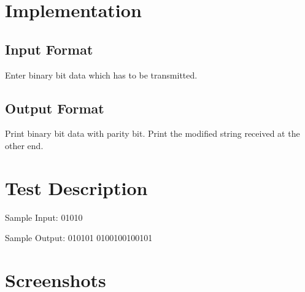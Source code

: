 \documentclass[12pt]{article}
\begin{document}
\begin{flushleft}

\section{  Implementation}

\subsection{Input Format}
\begin{flushleft}
Enter binary bit data which has to be transmitted.



\end{flushleft}


\subsection{ Output Format}
\begin{flushleft}

Print binary bit data with parity bit.
Print the modified string received at the other end.

\end{flushleft}





\section{ Test Description}

Sample Input:
01010

 
Sample Output:
010101
0100100100101


\section { Screenshots}





\end{flushleft}
\end{document}

